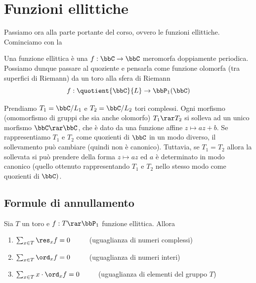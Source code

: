 \chapter{Funzioni ellittiche}

Passiamo ora alla parte portante del corso, ovvero le funzioni ellittiche. Cominciamo con la

\begin{definizione}
    Una funzione ellittica è una $f:\bbC\to\bbC$ meromorfa doppiamente periodica. Possiamo dunque passare al quoziente e pensarla come funzione olomorfa (tra superfici di Riemann) da un toro alla sfera di Riemann $$ f: \quotient{\bbC}{L}\to \bbP_1(\bbC)$$
\end{definizione}

Prendiamo $T_1=\bbC/L_1$ e $T_2=\bbC/L_2$ tori complessi.
Ogni morfismo (omomorfismo di gruppi che sia anche olomorfo) $T_1\rar T_2$ si solleva ad un unico morfismo $\bbC\rar\bbC$, che è dato da una funzione affine $z \mapsto az + b$.
Se rappresentiamo $T_1$ e $T_2$ come quozienti di $\bbC$ in un modo diverso, il sollevamento può cambiare (quindi non è canonico).
Tuttavia, se $T_1=T_2$ allora la sollevata si può prendere della forma $z \mapsto az$ ed $a$ è determinato in modo canonico (quello ottenuto rappresentando $T_1$ e $T_2$ nello stesso modo come quozienti di $\bbC)$.

\section{Formule di annullamento}

\begin{teorema}
  \label{residui-funzioni-toriche}
  Sia $T$ un toro e $f:T\rar\bbP_1$ funzione ellittica. Allora
\begin{enumerate}
    \item $\sum_{x\in T}\res_xf=0$ $\qquad$ (uguaglianza di numeri complessi)

    \item $\sum_{x\in T}\ord_xf=0$ $\qquad$ (uguaglianza di numeri interi)

    \item $\sum_{x\in T}x\cdot\ord_xf=0$ $\qquad$ (uguaglianza di elementi del gruppo $T$)
\end{enumerate}

\end{teorema}


